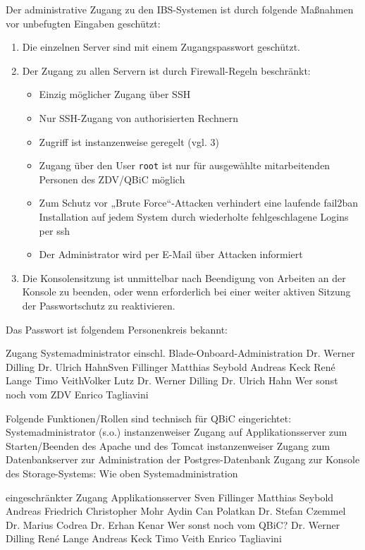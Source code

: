 \documentclass[]{scrreprt}
\begin{document}
Der administrative Zugang zu den IBS-Systemen ist durch folgende Maßnahmen vor unbefugten Eingaben geschützt: 
\begin{enumerate}
	\item Die einzelnen Server sind mit einem Zugangspasswort geschützt. 
	\item Der Zugang zu allen Servern ist durch Firewall-Regeln beschränkt:
		\begin{itemize}
			\item Einzig möglicher Zugang über SSH
			\item Nur SSH-Zugang von authorisierten Rechnern
			\item Zugriff ist instanzenweise geregelt (vgl. 3)
			\item Zugang über den User \texttt{root} ist nur für ausgewählte mitarbeitenden Personen des ZDV/QBiC möglich
			\item Zum Schutz vor „Brute Force“-Attacken verhindert eine laufende fail2ban Installation auf jedem System durch wiederholte fehlgeschlagene Logins per ssh
			\item Der Administrator wird per E-Mail über Attacken informiert
		\end{itemize}
	
	\item Die Konsolensitzung ist unmittelbar nach Beendigung von Arbeiten an der Konsole zu beenden, oder wenn erforderlich bei einer weiter aktiven Sitzung der Passwortschutz zu reaktivieren.
\end{enumerate}

Das Passwort ist folgendem Personenkreis bekannt:




Zugang Systemadministrator einschl. Blade-Onboard-Administration
Dr. Werner Dilling
Dr. Ulrich HahnSven Fillinger
Matthias Seybold
Andreas Keck
René Lange
Timo VeithVolker Lutz
Dr. Werner Dilling
Dr. Ulrich Hahn
Wer sonst noch vom ZDV
Enrico Tagliavini	

Folgende Funktionen/Rollen sind technisch für QBiC eingerichtet:
Systemadministrator (s.o.)
instanzenweiser Zugang auf Applikationsserver zum Starten/Beenden des Apache und des Tomcat
instanzenweiser Zugang zum Datenbankserver zur Administration der Postgres-Datenbank
Zugang zur Konsole des Storage-Systems: Wie oben Systemadministration


eingeschränkter Zugang Applikationsserver
Sven Fillinger
Matthias Seybold
Andreas Friedrich
Christopher Mohr
Aydin Can Polatkan
Dr. Stefan Czemmel
Dr. Marius Codrea
Dr. Erhan Kenar
Wer sonst noch vom QBiC?
Dr. Werner Dilling
René Lange
Andreas Keck
Timo Veith
Enrico Tagliavini
\end{document}
